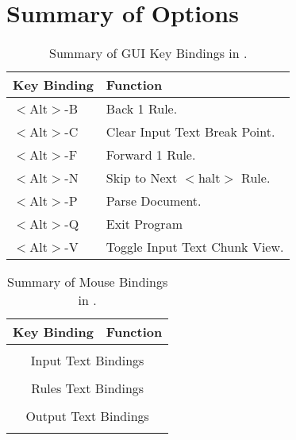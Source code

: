 
\chapter{Summary of Options}


{\footnotesize
\begin{table}
 \begin{center}
 \caption{Summary of GUI Key Bindings in \program .}
 \label{tab:gui_keybind_summary}
  \vskip 12pt
  \begin{tabular}{|ll|} \hline
Key Binding & Function \\ \hline\hline
 $<$Alt$>$-B & Back 1 Rule. \\
 $<$Alt$>$-C & Clear Input Text Break Point.\\
 $<$Alt$>$-F & Forward 1 Rule.\\
 $<$Alt$>$-N & Skip to Next $<$halt$>$ Rule. \\
 $<$Alt$>$-P & Parse Document. \\
 $<$Alt$>$-Q & Exit Program \\
 $<$Alt$>$-V & Toggle Input Text Chunk View. \\ \hline
   \end{tabular}
  \end{center}
\end{table}
}


{\footnotesize

\begin{table}
 \begin{center}
 \caption{Summary of Mouse Bindings in \program .}
 \label{tab:input_mousebind_summary}
  \vskip 12pt
  \begin{tabular}{|ll|} \hline
Key Binding & Function \\ \hline\hline
 & \\
\multicolumn{2}{|c|}{Input Text Bindings} \\
 & \\
\multicolumn{2}{|c|}{Rules Text Bindings} \\
 & \\
\multicolumn{2}{|c|}{Output Text Bindings} \\
 & \\ \hline
   \end{tabular}
  \end{center}
\end{table}
}


